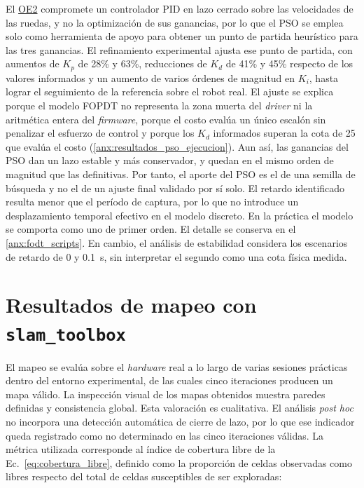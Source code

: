 El \hyperref[oe2]{OE2} compromete un controlador PID en lazo cerrado sobre las
velocidades de las ruedas, y no la optimización de sus ganancias, por lo que el
PSO se emplea solo como herramienta de apoyo para obtener un punto de partida
heurístico para las tres ganancias. El
refinamiento experimental ajusta ese punto de partida, con aumentos de $K_p$ de
28\% y 63\%, reducciones de $K_d$ de 41\% y 45\% respecto de los valores
informados y un aumento de varios órdenes de magnitud en $K_i$, hasta lograr el
seguimiento de la referencia sobre el robot real. El ajuste se explica porque el
modelo FOPDT no representa la zona muerta del \textit{driver} ni la aritmética
entera del \textit{firmware}, porque el costo evalúa un único escalón sin
penalizar el esfuerzo de control y porque los $K_d$ informados superan la cota
de 25 que evalúa el costo (\ref{anx:resultados_pso_ejecucion}). Aun así, las
ganancias del PSO dan un lazo estable y más conservador, y quedan en el mismo
orden de magnitud que las definitivas. Por tanto, el aporte del PSO es el de una semilla de
búsqueda y no el de un ajuste final validado por sí solo. El retardo
identificado resulta menor que el período de captura, por lo que no introduce
un desplazamiento temporal efectivo en el modelo discreto. En la práctica el
modelo se comporta como uno de primer orden. El detalle se conserva en el
\ref{anx:fodt_scripts}. En cambio, el análisis de estabilidad considera
los escenarios de retardo de 0 y 0.1~s, sin interpretar el segundo como una
cota física medida.

\section{Resultados de mapeo con \texttt{slam\_toolbox}}
\label{sec:resultados_slam}

El mapeo se evalúa sobre el \textit{hardware} real a lo largo de varias sesiones prácticas dentro del entorno experimental, de las cuales cinco iteraciones producen un mapa válido. La inspección visual de los mapas obtenidos muestra paredes definidas y consistencia global. Esta valoración es cualitativa. El análisis \textit{post hoc} no incorpora una detección automática de cierre de lazo, por lo que ese indicador queda registrado como no determinado en las cinco iteraciones válidas.
La métrica utilizada corresponde al índice de cobertura libre de la
Ec.~\eqref{eq:cobertura_libre}, definido como la proporción de celdas
observadas como libres respecto del total de celdas susceptibles de ser
exploradas:

